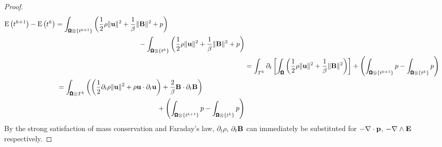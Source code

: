     \begin{proof}
        \begin{align}
            \begin{split}
                \mathrm{E}\left(t^{k + 1}\right) - \mathrm{E}\left(t^{k}\right)  &=  \int_{\pmb{\mathsf{\Omega}}\otimes\left\{t^{k + 1}\right\}}\left(\frac{1}{2}\rho\|\mathbf{u}\|^{2} + \frac{1}{\beta}\|\mathbf{B}\|^{2} + p\right)  \\
                &\;\;\;\;\;\;\;\;\;\;\;\;\;\;\;\;\;\;\;\;\;\;\;\;\;\;\;\;\;\;\;\;\;\;\;\;\;\;\;\;\;\;\;\;- \int_{\pmb{\mathsf{\Omega}}\otimes\left\{t^{k}\right\}}\left(\frac{1}{2}\rho\|\mathbf{u}\|^{2} + \frac{1}{\beta}\|\mathbf{B}\|^{2} + p\right)
            \end{split}  \\
            &=  \int_{T^{k}}\partial_{t}\left[\int_{\pmb{\mathsf{\Omega}}}\left(\frac{1}{2}\rho\|\mathbf{u}\|^{2} + \frac{1}{\beta}\|\mathbf{B}\|^{2}\right)\right] + \left(\int_{\pmb{\mathsf{\Omega}}\otimes\left\{t^{k + 1}\right\}}p - \int_{\pmb{\mathsf{\Omega}}\otimes\left\{t^{k}\right\}}p\right)  \\
            \begin{split}
                &=  \int_{\pmb{\mathsf{\Omega}}\otimes T^{k}}\left(\left(\frac{1}{2}\partial_{t}\rho\|\mathbf{u}\|^{2} + \rho\mathbf{u}\cdot\partial_{t}\mathbf{u}\right) + \frac{2}{\beta}\mathbf{B}\cdot\partial_{t}\mathbf{B}\right)  \\
                &\;\;\;\;\;\;\;\;\;\;\;\;\;\;\;\;\;\;\;\;\;\;\;\;\;\;\;\;\;\;\;\;\;\;\;\;\;\;\;\;\;\;\;\;\;\;\;\;\;\;\;\;\;+ \left(\int_{\pmb{\mathsf{\Omega}}\otimes\left\{t^{k + 1}\right\}}p - \int_{\pmb{\mathsf{\Omega}}\otimes\left\{t^{k}\right\}}p\right)
            \end{split}
        \end{align}
        By the strong satisfaction of mass conservation and Faraday's law, $\partial_{t}\rho$, $\partial_{t}\mathbf{B}$ can immediately be substituted for $- \nabla\cdot\mathbf{p}$, $- \nabla\wedge\mathbf{E}$ respectively.
        

\end{proof}
